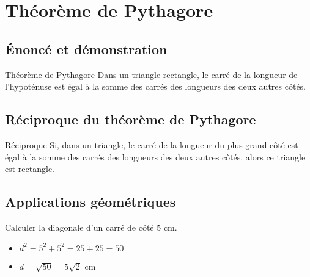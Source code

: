 \chapter{Théorème de Pythagore}

\section{Énoncé et démonstration}
\begin{propriete}{Théorème de Pythagore}
Dans un triangle rectangle, le carré de la longueur de l'hypoténuse est égal à la somme des carrés des longueurs des deux autres côtés.
\end{propriete}

\section{Réciproque du théorème de Pythagore}
\begin{propriete}{Réciproque}
Si, dans un triangle, le carré de la longueur du plus grand côté est égal à la somme des carrés des longueurs des deux autres côtés, alors ce triangle est rectangle.
\end{propriete}

\section{Applications géométriques}
\begin{exemple}
Calculer la diagonale d'un carré de côté 5 cm.
\begin{itemize}
    \item $d^2 = 5^2 + 5^2 = 25 + 25 = 50$
    \item $d = \sqrt{50} = 5\sqrt{2}$ cm
\end{itemize}
\end{exemple} 
